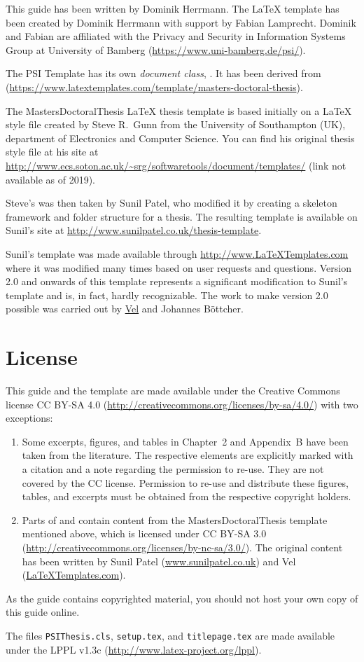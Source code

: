 This guide has been written by Dominik Herrmann. The LaTeX template has been created by Dominik Herrmann with support by Fabian Lamprecht. Dominik and Fabian are affiliated with the Privacy and Security in Information Systems Group at University of Bamberg (\url{https://www.uni-bamberg.de/psi/}).


The PSI Template has its own \emph{document class}, . It has been derived from  (\url{https://www.latextemplates.com/template/masters-doctoral-thesis}).

The MastersDoctoralThesis LaTeX thesis template is based initially on a LaTeX style file created by Steve R.\ Gunn from the University of Southampton (UK), department of Electronics and Computer Science. You can find his original thesis style file at his site at
\url{http://www.ecs.soton.ac.uk/~srg/softwaretools/document/templates/} (link not available as of 2019).

Steve's  was then taken by Sunil Patel, who modified it by creating a skeleton framework and folder structure for a thesis. The resulting template is available on Sunil's site at
\url{http://www.sunilpatel.co.uk/thesis-template}.

Sunil's template was made available through \url{http://www.LaTeXTemplates.com} where it was modified many times based on user requests and questions. Version 2.0 and onwards of this template represents a significant modification to Sunil's template and is, in fact, hardly recognizable. The work to make version 2.0 possible was carried out by \href{mailto:vel@latextemplates.com}{Vel} and Johannes Böttcher.


\section{License}
\label{sec:license}

This guide and the template are made available under the Creative Commons license 
CC BY-SA 4.0 (\url{http://creativecommons.org/licenses/by-sa/4.0/}) with two exceptions:

\begin{enumerate}
\item Some excerpts, figures, and tables in Chapter~2 and Appendix~B have been taken from the
literature. The respective elements are explicitly marked with a citation and a note
regarding the permission to re-use. They are not
covered by the CC license. Permission to re-use and distribute
these figures, tables, and excerpts must be obtained from the
respective copyright holders.

\item Parts of  and  contain content from the
MastersDoctoralThesis template mentioned above, which is licensed under 
CC BY-SA 3.0 (\url{http://creativecommons.org/licenses/by-nc-sa/3.0/}). 
The original content has been written by
Sunil Patel (\href{http://www.sunilpatel.co.uk}{www.sunilpatel.co.uk}) and
Vel (\href{http://www.LaTeXTemplates.com}{LaTeXTemplates.com}).
\end{enumerate}

As the guide contains copyrighted material, you should not host your own copy of this guide online.

The files \texttt{PSIThesis.cls}, \texttt{setup.tex}, and \texttt{titlepage.tex} are made available under
the LPPL v1.3c (\url{http://www.latex-project.org/lppl}).
